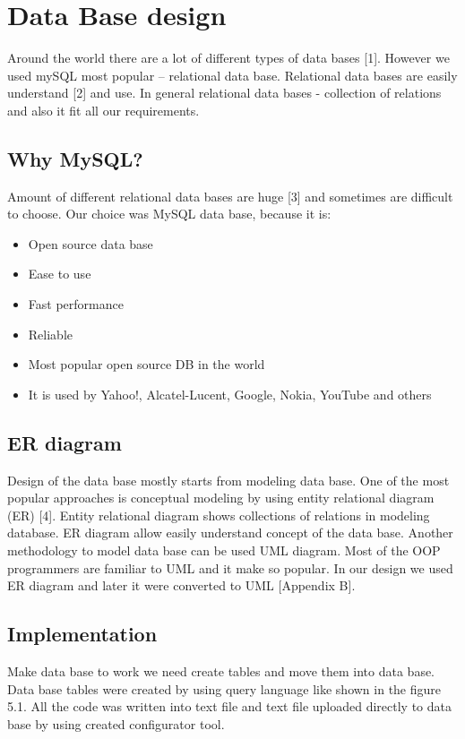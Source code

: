 %
\section{Data Base design}

Around the world there are a lot of different types of data bases [1]. However we used mySQL most popular – relational data base. Relational data bases are easily understand [2] and use. In general relational data bases - collection of relations and also it fit all our requirements.

\subsection{Why MySQL?}

Amount of different relational data bases are huge [3] and sometimes are difficult to choose. Our choice was MySQL data base, because it is:

\begin{itemize}
	\item Open source data base
	\item Ease to use
	\item Fast performance
	\item Reliable 
	\item Most popular open source DB in the world
	\item It is used by Yahoo!, Alcatel-Lucent, Google, Nokia, YouTube and others
\end{itemize}

\subsection{ER diagram}

Design of the data base mostly starts from modeling data base. One of the most popular approaches is conceptual modeling by using entity relational diagram (ER) [4]. Entity relational diagram shows collections of relations in modeling database. ER diagram allow easily understand concept of the data base. Another methodology to model data base can be used UML diagram. Most of the OOP programmers are familiar to UML and it make so popular. In our design we used ER diagram and later it were converted to UML [Appendix B].

\subsection{Implementation}

Make data base to work we need create tables and move them into data base. Data base tables were created by using query language like shown in the figure 5.1. All the code was written into text file and text file uploaded directly to data base by using created configurator tool.


